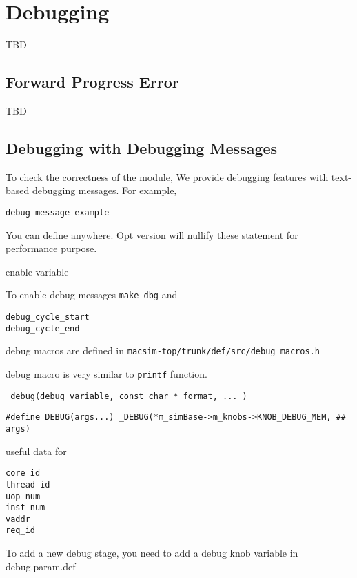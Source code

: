 

\chapter{Debugging}
\label{sec:debugging}
TBD 
\section{Forward Progress Error}
TBD 



\section{Debugging with Debugging Messages}

To check the correctness of the module, We provide debugging features
with text-based debugging messages. For example,

\begin{Verbatim}
debug message example
\end{Verbatim}

You can define anywhere. Opt version will nullify these statement for
performance purpose.

enable variable

To enable debug messages \Verb+make dbg+ and 

\begin{Verbatim}
debug_cycle_start
debug_cycle_end
\end{Verbatim}

debug macros are defined in \Verb+macsim-top/trunk/def/src/debug_macros.h+

debug macro is very similar to \Verb+printf+ function.

\begin{Verbatim}
_debug(debug_variable, const char * format, ... )
\end{Verbatim}

\begin{Verbatim}
#define DEBUG(args...) _DEBUG(*m_simBase->m_knobs->KNOB_DEBUG_MEM, ## args)
\end{Verbatim}


useful data for 

\begin{Verbatim}
core id
thread id
uop num
inst num
vaddr
req_id
\end{Verbatim}


To add a new debug stage, you need to add a debug knob variable in debug.param.def


